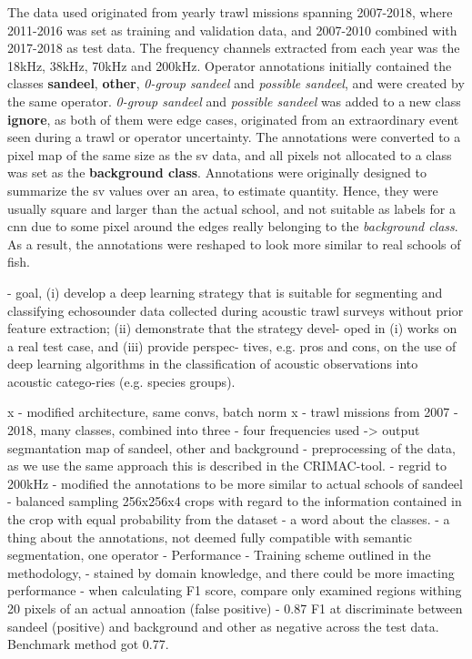     The data used originated from yearly trawl missions spanning 2007-2018\cite{brautaset2020acoustic}, where 2011-2016 was set as training and validation data, and 2007-2010 combined with 2017-2018 as test data. The frequency channels extracted from each year was the 18kHz, 38kHz, 70kHz and 200kHz. Operator annotations initially contained the classes \textbf{sandeel}, \textbf{other}, \textit{0-group sandeel} and \textit{possible sandeel}, and were created by the same operator. \textit{0-group sandeel} and \textit{possible sandeel} was added to a new class \textbf{ignore}, as both of them were edge cases, originated from an extraordinary event seen during a trawl or operator uncertainty. The annotations were converted to a pixel map of the same size as the \gls{sv} data, and all pixels not allocated to a class was set as the \textbf{background class}. Annotations were originally designed to summarize the \gls{sv} values over an area, to estimate quantity. Hence, they were usually square and larger than the actual school, and not suitable as labels for a \gls{cnn} due to some pixel around the edges really belonging to the \textit{background class}. As a result, the annotations were reshaped to look more similar to real schools of fish.
    
    
    - goal, (i) develop a deep learning
        strategy that is suitable
        for segmenting and classifying echosounder data collected during acoustic trawl surveys without prior feature extraction; (ii) demonstrate that the strategy devel-
        oped in (i) works on a real test case, and (iii) provide perspec- tives, e.g. pros and cons, on the use of deep learning algorithms in the classification of acoustic observations into acoustic catego-ries (e.g. species groups).



x    - modified architecture, same convs, batch norm
x    - trawl missions from 2007 - 2018, many classes, combined into three
    - four frequencies used -> output segmantation map of sandeel, other and background
    - preprocessing of the data, as we use the same approach this is described in the CRIMAC-tool.
        - regrid to 200kHz
    - modified the annotations to be more similar to actual schools of sandeel
    - balanced sampling 256x256x4 crops with regard to the information contained in the crop with equal probability from the dataset
    - a word about the classes.
    - a thing about the annotations, not deemed fully compatible with semantic segmentation, one operator
    - Performance
        - Training scheme outlined in the methodology, 
        - stained by domain knowledge, and there could be more imacting performance
            - when calculating F1 score, compare only examined regions withing 20 pixels of an actual annoation (false positive)
            - 0.87 F1 at discriminate between sandeel (positive) and background and other as negative across the test data. Benchmark method got 0.77.
            
